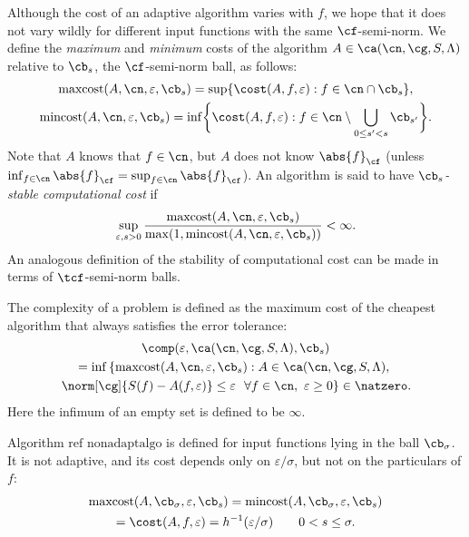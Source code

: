 \documentclass[]{elsarticle}
\DeclareMathOperator{\maxcost}{maxcost}
\DeclareMathOperator{\mincost}{mincost}
\theoremstyle{definition}
\theoremstyle{remark}
\newcommand{\Fnorm}[1]{\abs{#1}_{\cf}}
\begin{document}
Although the cost of an adaptive algorithm varies with $f$, we hope that it does not vary wildly for different input functions with the same $\cf$-semi-norm. We define the \emph{maximum} and \emph{minimum} costs of the algorithm $A\in \ca(\cn,\cg,S,\Lambda)$ relative to $\cb_{s}$, the $\cf$-semi-norm ball, as follows:
\begin{gather*}
\maxcost(A,\cn,\varepsilon,\cb_s)
= \sup \{ \cost(A,f,\varepsilon) : f \in \cn \cap \cb_{s} \}, \\ \mincost(A,\cn,\varepsilon,\cb_s)
= \inf \biggl \{ \cost(A,f,\varepsilon) : f \in \cn\setminus \bigcup_{0 \le s'<s}\cb_{s'} \biggr \} .
\end{gather*}
Note that $A$ knows that $f \in \cn$, but $A$ does not know $\Fnorm{f}$ (unless $\inf_{f \in \cn} \Fnorm{f}=\sup_{f \in \cn} \Fnorm{f}$).  An algorithm is said to have \emph{$\cb_{s}$-stable computational cost} if
\begin{equation*}\label{coststabledef}
\sup_{\varepsilon, s > 0} \frac{\maxcost(A,\cn,\varepsilon,\cb_s)}{\max(1,\mincost(A,\cn,\varepsilon, \cb_s))} < \infty.
\end{equation*}
An analogous definition of the stability of computational cost can be made in terms of $\tcf$-semi-norm balls.

The complexity of a problem is defined as the maximum cost of the cheapest algorithm that always satisfies the error tolerance:
\begin{multline*}
\comp(\varepsilon,\ca(\cn,\cg,S,\Lambda),\cb_s) \\
 = \inf\left\{\maxcost(A,\cn,\varepsilon,\cb_s) : A \in \ca(\cn,\cg,S,\Lambda), \right. \\
 \left . \norm[\cg]{S(f)-A(f,\varepsilon)} \le \varepsilon \ \ \forall f \in \cn, \ \varepsilon \ge 0 \right \} \in \natzero.
\end{multline*}
Here the infimum of an empty set is defined to be $\infty$.

Algorithm $\text{ref nonadaptalgo}$ is defined for input functions lying in the ball $\cb_{\sigma}$.  It is not adaptive, and its cost depends only on $\varepsilon/\sigma$, but not on the particulars of $f$:
\begin{multline} \label{nonadaptalgocost}
\maxcost(A,\cb_{\sigma},\varepsilon,\cb_{s}) = \mincost(A,\cb_{\sigma},\varepsilon,\cb_{s}) \\
= \cost(A,f,\varepsilon) = h^{-1}(\varepsilon/\sigma) \qquad 0 < s \le \sigma.
\end{multline}
\end{document}
